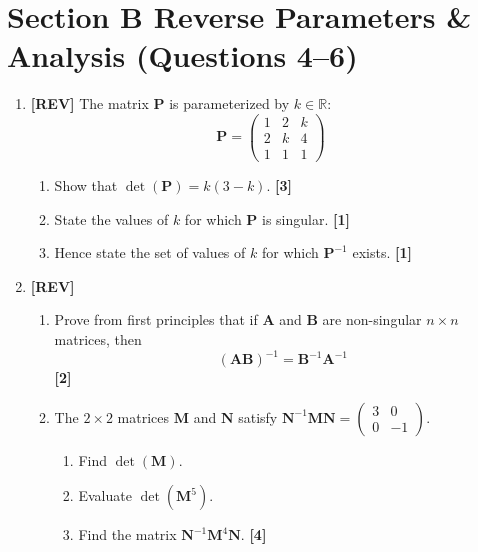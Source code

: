 \documentclass[11pt,a4paper]{article}
\begin{document}
\section*{Section B \quad Reverse Parameters \& Analysis \hfill{\normalfont\small(Questions 4--6)}}
\begin{enumerate}[resume]
\item \textbf{[REV]} The matrix $\mathbf{P}$ is parameterized by $k \in \mathbb{R}$:
\[
\mathbf{P} = \begin{pmatrix} 1 & 2 & k \\ 2 & k & 4 \\ 1 & 1 & 1 \end{pmatrix}
\]
\begin{enumerate}
  \item Show that $\det(\mathbf{P}) = k(3 - k)$. \hfill{\small\textbf{[3]}}
  \item State the values of $k$ for which $\mathbf{P}$ is singular. \hfill{\small\textbf{[1]}}
  \item Hence state the set of values of $k$ for which $\mathbf{P}^{-1}$ exists. \hfill{\small\textbf{[1]}}
\end{enumerate}

\item \textbf{[REV]}
\begin{enumerate}
  \item Prove from first principles that if $\mathbf{A}$ and $\mathbf{B}$ are non-singular $n \times n$ matrices, then
  \[
  (\mathbf{A}\mathbf{B})^{-1} = \mathbf{B}^{-1}\mathbf{A}^{-1}
  \]
  \hfill{\small\textbf{[2]}}
  \item The $2 \times 2$ matrices $\mathbf{M}$ and $\mathbf{N}$ satisfy $\mathbf{N}^{-1}\mathbf{M}\mathbf{N} = \begin{pmatrix} 3 & 0 \\ 0 & -1 \end{pmatrix}$.
  \begin{enumerate}[label=(\roman*)]
    \item Find $\det(\mathbf{M})$.
    \item Evaluate $\det(\mathbf{M}^5)$.
    \item Find the matrix $\mathbf{N}^{-1}\mathbf{M}^4\mathbf{N}$. \hfill{\small\textbf{[4]}}
  \end{enumerate}
\end{enumerate}


\end{enumerate}
\end{document}
